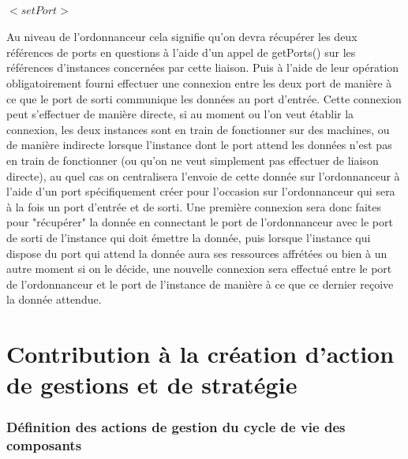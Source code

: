 \documentclass{article}
\begin{document}
    \subsection{$<setPort>$}
    Au niveau de l'ordonnanceur cela signifie qu'on devra récupérer les deux références de ports en questions à l'aide d'un appel de getPorts() sur les références d'instances concernées par cette liaison. Puis à l'aide de leur opération obligatoirement fourni effectuer une connexion entre les deux port de manière à ce que le port de sorti communique les données au port d'entrée. Cette connexion peut s'effectuer de manière directe, si au moment ou l'on veut établir la connexion, les deux instances sont en train de fonctionner sur des machines, ou de manière indirecte lorsque l'instance dont le port attend les données n'est pas en train de fonctionner (ou qu'on ne veut simplement pas effectuer de liaison directe), au quel cas on centralisera l'envoie de cette donnée sur l'ordonnanceur à l'aide d'un port spécifiquement créer pour l'occasion sur l'ordonnanceur qui sera à la fois un port d'entrée et de sorti. Une première connexion sera donc faites pour "récupérer" la donnée en connectant le port de l'ordonnanceur avec le port de sorti de l'instance qui doit émettre la donnée, puis lorsque l'instance qui dispose du port qui attend la donnée aura ses ressources affrétées ou bien à un autre moment si on le décide, une nouvelle connexion sera effectué entre le port de l'ordonnanceur et le port de l'instance de manière à ce que ce dernier reçoive la donnée attendue.



\part{Contribution à la création d'action de gestions et de stratégie }

\section{Définition des actions de gestion du cycle de vie des composants}
\end{document}
